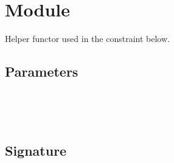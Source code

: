 \section{Module }\label{Oxcaml-F_with}%
Helper functor used in the  constraint below.

\subsection{Parameters\label{Oxcaml-F_with--parameters}}%
\label{Oxcaml-F_with--argument-1-X}\label{Oxcaml-F_with-argument-1-X}\begin{ocamlindent}\label{Oxcaml-F_with-argument-1-X--type-s}\\
\end{ocamlindent}%
\\
\subsection{Signature\label{Oxcaml-F_with--signature}}%
\label{Oxcaml-F_with--type-t}\\


